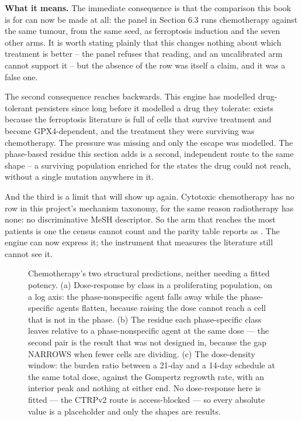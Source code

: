 \documentclass[11pt,twoside,openright]{report}
\begin{document}
\textbf{What it means.} The immediate consequence is that the comparison this book is for can now be made at all: the panel in Section 6.3 runs chemotherapy against the same tumour, from the same seed, as ferroptosis induction and the seven other arms. It is worth stating plainly that this changes nothing about which treatment is better -- the panel refuses that reading, and an uncalibrated arm cannot support it -- but the absence of the row was itself a claim, and it was a false one.

The second consequence reaches backwards. This engine has modelled drug-tolerant persisters since long before it modelled a drug they tolerate:  exists because the ferroptosis literature is full of cells that survive treatment and become GPX4-dependent, and the treatment they were surviving was chemotherapy. The pressure was missing and only the escape was modelled. The phase-based residue this section adds is a second, independent route to the same shape -- a surviving population enriched for the states the drug could not reach, without a single mutation anywhere in it.

And the third is a limit that will show up again. Cytotoxic chemotherapy has no row in this project's mechanism taxonomy, for the same reason radiotherapy has none: no discriminative MeSH descriptor. So the arm that reaches the most patients is one the census cannot count and the parity table reports as . The engine can now express it; the instrument that measures the literature still cannot see it.

\begin{figure}[tbp]
\setcounter{figure}{32}
\caption{Chemotherapy's two structural predictions, neither needing a fitted potency. (a) Dose-response by class in a proliferating population, on a log axis: the phase-nonspecific agent falls away while the phase-specific agents flatten, because raising the dose cannot reach a cell that is not in the phase. (b) The residue each phase-specific class leaves relative to a phase-nonspecific agent at the same dose --- the second pair is the result that was not designed in, because the gap NARROWS when fewer cells are dividing. (c) The dose-density window: the burden ratio between a 21-day and a 14-day schedule at the same total dose, against the Gompertz regrowth rate, with an interior peak and nothing at either end. No dose-response here is fitted --- the CTRPv2 route is access-blocked --- so every absolute value is a placeholder and only the shapes are results.}
\label{fig:fig37_chemotherapy}
\end{figure}
\end{document}
